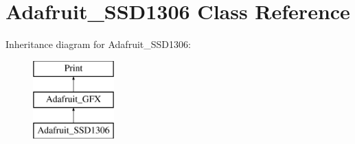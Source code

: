 \hypertarget{class_adafruit___s_s_d1306}{}\section{Adafruit\+\_\+\+S\+S\+D1306 Class Reference}
\label{class_adafruit___s_s_d1306}
Inheritance diagram for Adafruit\+\_\+\+S\+S\+D1306\+:\begin{figure}[H]
\begin{center}
\leavevmode
\includegraphics[height=3.000000cm]{class_adafruit___s_s_d1306}
\end{center}
\end{figure}
